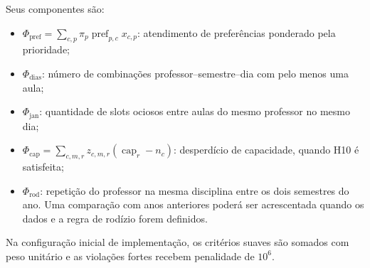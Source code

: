 Seus componentes são:
\begin{itemize}
    \item $\Phi_{\mathrm{pref}}=\sum_{c,p}\pi_p\operatorname{pref}_{p,c}x_{c,p}$: atendimento de preferências ponderado pela prioridade;
    \item $\Phi_{\mathrm{dias}}$: número de combinações professor--semestre--dia com pelo menos uma aula;
    \item $\Phi_{\mathrm{jan}}$: quantidade de slots ociosos entre aulas do mesmo professor no mesmo dia;
    \item $\Phi_{\mathrm{cap}}=\sum_{c,m,r}z_{c,m,r}(\operatorname{cap}_r-n_c)$: desperdício de capacidade, quando H10 é satisfeita;
    \item $\Phi_{\mathrm{rod}}$: repetição do professor na mesma disciplina entre os dois semestres do ano. Uma comparação com anos anteriores poderá ser acrescentada quando os dados e a regra de rodízio forem definidos.
\end{itemize}

Na configuração inicial de implementação, os critérios suaves são somados com peso unitário e as violações fortes recebem penalidade de $10^6$. 

